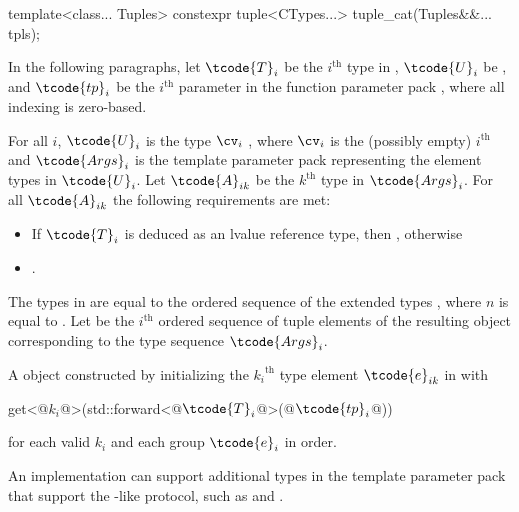 \begin{itemdecl}
template<class... Tuples>
  constexpr tuple<CTypes...> tuple_cat(Tuples&&... tpls);
\end{itemdecl}

\begin{itemdescr}  %
\pnum
In the following paragraphs, let $\tcode{T}_i$ be the $i^\text{th}$ type in ,
$\tcode{U}_i$ be , and $\tcode{tp}_i$ be the $i^\text{th}$
parameter in the function parameter pack , where all indexing is
zero-based.

\pnum
\expects
For all $i$, $\tcode{U}_i$ is the type
$\cv_i$ , where $\cv_i$ is the (possibly empty) $i^\text{th}$
 and $\tcode{Args}_i$ is the template parameter pack representing the element
types in $\tcode{U}_i$. Let $\tcode{A}_{ik}$ be the ${k}^\text{th}$ type in $\tcode{Args}_i$. For all
$\tcode{A}_{ik}$ the following requirements are met:
\begin{itemize}
\item If $\tcode{T}_i$ is deduced as an lvalue reference type, then
      , otherwise
\item {}.
\end{itemize}

\pnum
\remarks
The types in  are equal to the ordered
sequence of the extended types
,
where $n$ is
equal to . Let  be the $i^\text{th}$
ordered sequence of tuple elements of the resulting  object
corresponding to the type sequence $\tcode{Args}_i$.

\pnum
\returns
A  object constructed by initializing the ${k_i}^\text{th}$
type element $\tcode{e}_{ik}$ in  with
\begin{codeblock}
get<@$k_i$@>(std::forward<@$\tcode{T}_i$@>(@$\tcode{tp}_i$@))
\end{codeblock}
for each valid $k_i$ and each group $\tcode{e}_i$ in order.

\pnum
\begin{note}
An implementation can support additional types in the template parameter
pack  that support the -like protocol, such as
 and .
\end{note}
\end{itemdescr}

